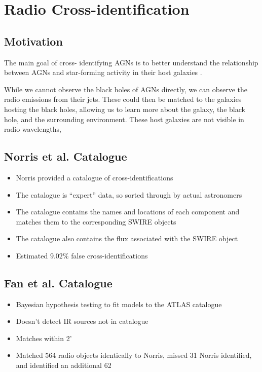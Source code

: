     \section{Radio Cross-identification}
    \label{sec:radio-cross-identification}

        \subsection{Motivation}
        \label{sec:cross-identification-motivation}

        The main goal of cross-
        identifying AGNs is to better understand the relationship between AGNs
        and star-forming activity in their host galaxies \citep{norris06}.

        While we cannot observe the black holes of AGNs directly, we can observe
        the radio emissions from their jets. These could then be matched to the
        galaxies hosting the black holes, allowing us to learn more about the
        galaxy, the black hole, and the surrounding environment. These host
        galaxies are not visible in radio wavelengths,

        \subsection{Norris et al. Catalogue}
        \label{sec:norris}

            \begin{itemize}
                \item Norris provided a catalogue of cross-identifications
                \item The catalogue is ``expert'' data, so sorted through by actual astronomers
                \item The catalogue contains the names and locations of each component and matches them to the corresponding SWIRE objects
                \item The catalogue also contains the flux associated with the SWIRE object
                \item Estimated $9.02\%$ false cross-identifications
            \end{itemize}

        \subsection{Fan et al. Catalogue}
        \label{sec:fan}

            \begin{itemize}
                \item Bayesian hypothesis testing to fit models to the ATLAS catalogue
                \item Doesn't detect IR sources not in catalogue
                \item Matches within 2'
                \item Matched 564 radio objects identically to Norris, missed 31 Norris identified, and identified an additional 62
            \end{itemize}

